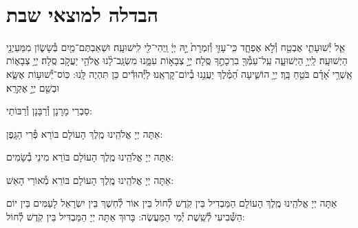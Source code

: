 \documentclass[twoside, openany, parskip=half, 11pt]{book}
\begin{document}
\aleinu

\ledavid

\mournerskaddish

\vfill


 \\


\section[הבדלה]{ הבדלה למוצאי שבת } \label{havdala}

אֵ֧ל יְ֯שׁוּעָתִ֛י אֶבְטַ֖ח וְ֯לֹ֣א אֶפְחָ֑ד כִּֽי־עָזִּ֤י וְ֯זִמְרָת֙ יָ֣הּ יְיָ֔ וַֽיְהִי־לִ֖י לִֽישׁוּעָֽה׃
וּשְׁאַבְתֶּם־מַ֖יִם בְּ֯שָׂשׂ֑וֹן מִמַּעַיְנֵ֖י הַיְשׁוּעָֽה׃
לַֽייָ֥ הַיְשׁוּעָ֑ה עַֽל־עַמְּ֯ךָ֖ בִרְכָתֶ֣ךָ סֶּֽלָה׃
יְיָ֣ צְבָא֣וֹת עִמָּ֑נוּ מִשְׂגָּֽב־לָ֨נוּ אֱלֹהֵ֖י יַעֲקֹ֣ב סֶֽלָה׃
יְיָ֥ צְבָא֑וֹת אַֽשְׁרֵ֥י אָ֝דָ֗ם בֹּטֵ֥חַ בָּֽךְ׃
יְיָ֥ הוֹשִׁ֑יעָה הַ֝מֶּ֗לֶךְ יַעֲנֵ֥נוּ בְ֯יוֹם־קׇרְאֵֽנוּ׃
לַיְּ֯הוּדִ֕ים  כֵּן תִּהְיֶה לָּֽנוּ: כּֽוֹס־יְ֯שׁוּע֥וֹת אֶשָּׂ֑א וּבְשֵׁ֖ם יְיָ֣ אֶקְרָֽא׃

\begin{scriptsize}
סַבְרֵי מָרָנָן וְ֯רַבָּנָן וְ֯רַבּוֹתַי: \\
\end{scriptsize}
אַתָּה יְיָ אֱלֹהֵֽינוּ מֶֽלֶךְ הָעוֹלָם בּוֹרֵא פְּ֯רִי הַגָּֽפֶן:

אַתָּה יְיָ אֱלֹהֵֽינוּ מֶֽלֶךְ הָעוֹלָם בּוֹרֵא מִינֵי בְ֯שָׂמִים:

אַתָּה יְיָ אֱלֹהֵֽינוּ מֶֽלֶךְ הָעוֹלָם בּוֹרֵא מְ֯אוֹרֵי הָאֵשׁ:

אַתָּה יְיָ אֱלֹהֵֽינוּ מֶֽלֶךְ הָעוֹלָם הַמַּבְדִיל בֵּין קֹֽדֶשׁ לְ֯חוֹל בֵּין אוֹר לְ֯חֽשֶׁךְ בֵּין יִשְׂרָאֵל לָעַמִּים בֵּין יוֹם הַשְּׁ֯בִיעִי לְ֯שֵֽׁשֶׁת יְ֯מֵי הַמַּעֲשֶׂה: בָּרוּךְ אַתָּה יְיָ הַמַּבְדִּיל בֵּין קֹֽדֶשׁ לְ֯חוֹל:
\clearpage

\vspace{-1.3\baselineskip}










\quad{}\quad{}\\
\end{document}
